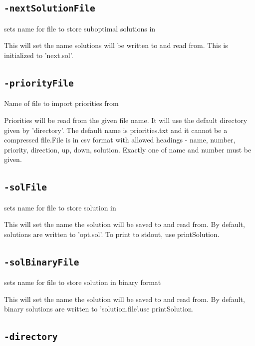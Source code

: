 \documentclass[11pt,a4paper]{article}
\begin{document}
\subsection*{\texttt{-nextSolutionFile}}

sets name for file to store suboptimal solutions in

This will set the name solutions will be written to and read from. This is initialized to 'next.sol'. 

\subsection*{\texttt{-priorityFile}}

Name of file to import priorities from

Priorities will be read from the given file name.  It will use the default directory given by 'directory'. The default name is priorities.txt and it cannot be a compressed file.File is in csv format with allowed headings - name, number, priority, direction, up, down, solution.  Exactly one of name and number must be given.

\subsection*{\texttt{-solFile}}

sets name for file to store solution in

This will set the name the solution will be saved to and read from. By default, solutions are written to 'opt.sol'. To print to stdout, use printSolution.

\subsection*{\texttt{-solBinaryFile}}

sets name for file to store solution in binary format

This will set the name the solution will be saved to and read from. By default, binary solutions are written to 'solution.file'.use printSolution.

\subsection*{\texttt{-directory}}
\end{document}
